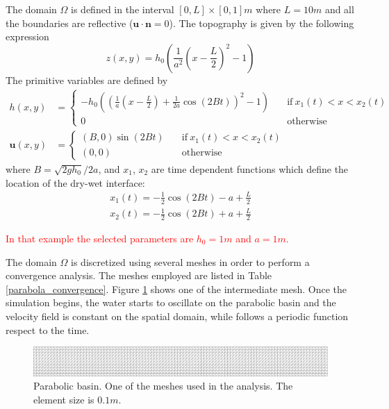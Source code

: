 \documentclass[a4paper,12pt]{elsarticle}
\newcommand{\Miguel}[1]{\textcolor{red}{#1}}
\begin{document}
The domain $\Omega$ is defined in the interval $[0,L]\times[0,1]m$ where $L=10m$ and all the boundaries are reflective ($\mathbf{u}\cdot\mathbf{n} = 0$). The topography is given by the following expression
\begin{equation}
z(x,y) = h_0 \left(\frac{1}{a^2}\left(x - \frac{L}{2}\right)^2 - 1\right)
\end{equation}
The primitive variables are defined by
\begin{subequations}
\begin{align}
h(x,y) &=
\begin{cases}
-h_0\left(\left(\frac{1}{a}\left(x - \frac{L}{2}\right) + \frac{1}{2a}\cos(2Bt)\right)^2 - 1\right)
\quad &\text{if} \ x_1(t) < x < x_2(t) \\
0 \quad &\text{otherwise}
\end{cases} \\
\mathbf{u}(x,y) &=
\begin{cases}
(B,0)\sin(2Bt) \quad &\text{if} \ x_1(t) < x < x_2(t) \\
(0,0) \quad &\text{otherwise}
\end{cases}
\end{align}
\end{subequations}
where $B=\sqrt{2gh_0}/2a$, and $x_1$, $x_2$ are time dependent functions which define the location of the dry-wet interface:
\begin{equation}
\begin{split}
x_1(t) = -\frac{1}{2}\cos(2Bt) - a + \frac{L}{2} \\
x_2(t) = -\frac{1}{2}\cos(2Bt) + a + \frac{L}{2}
\end{split}
\end{equation}

\Miguel{
In that example the selected parameters are $h_0=1m$ and $a=1m$.
}

The domain $\Omega$ is discretized using several meshes in order to perform a convergence analysis. The meshes employed are listed in Table \ref{parabola_convergence}. Figure \ref{parabola_mesh} shows one of the intermediate mesh. Once the simulation begins, the water starts to oscillate on the parabolic basin and the velocity field is constant on the spatial domain, while follows a periodic function respect to the time.

\begin{figure}
    \includegraphics[width=\textwidth]{img/par/mesh_0.1.pdf}
    \caption{Parabolic basin. One of the meshes used in the analysis. The element size is $0.1m$.}
    \label{parabola_mesh}
\end{figure}
\end{document}
